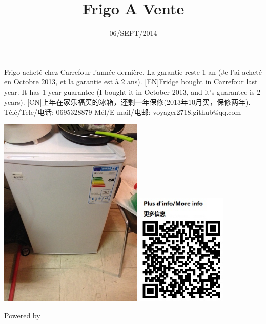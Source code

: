\documentclass[UTF8]{ctexart}
\title{Frigo A Vente}
\date{06/SEPT/2014}
\begin{document}
\maketitle
\thispagestyle{empty}
\noindent
[FR]Frigo achet\'e chez Carrefour l'ann\'ee derni\`ere. La garantie reste 1 an (Je l'ai achet\'e en Octobre 2013, et la garantie est \`a 2 ans). [EN]Fridge bought in Carrefour last year. It has 1 year guarantee (I bought it in October 2013, and it's guarantee is 2 years). [CN]上年在家乐福买的冰箱，还剩一年保修(2013年10月买，保修两年).
\\
T\'el\'e/Tele/电话: 0695328879 M\'el/E-mail/电邮: voyager2718.github@qq.com
\\
\begin{center}
\includegraphics[width=2.7in]{frigo2.jpg}
\includegraphics[width=1.7in]{qrcode.jpg}
\end{center}
Powered by \XeLaTeX{}
\end{document}
